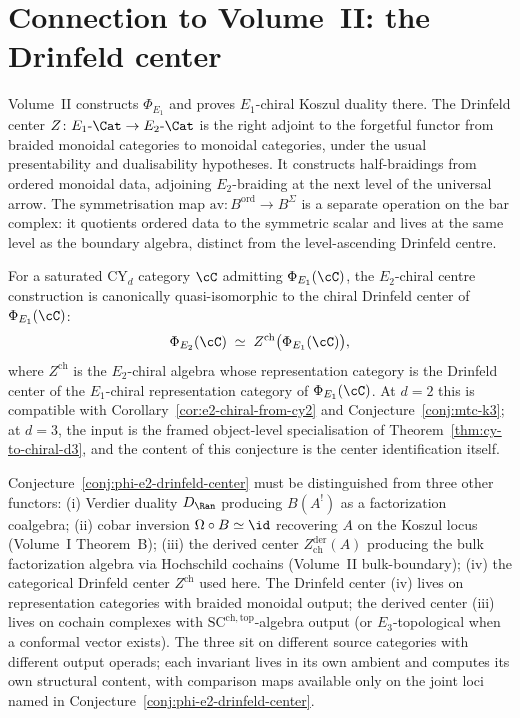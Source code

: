 \section{Connection to Volume~II: the Drinfeld center}
\label{sec:drinfeld-center-bridge}

Volume~II constructs $\Phi_{E_1}$ and proves $E_1$-chiral Koszul
duality there. The Drinfeld center
$Z\colon E_1\text{-}\Cat \to E_2\text{-}\Cat$
is the right adjoint to the forgetful functor from braided monoidal
categories to monoidal categories, under the usual presentability and
dualisability hypotheses. It constructs half-braidings from ordered
monoidal data, adjoining $E_2$-braiding at the next level of the
universal arrow. The symmetrisation map
$\mathrm{av}\colon B^{\mathrm{ord}} \to B^\Sigma$ is a separate
operation on the bar complex: it quotients ordered data to the
symmetric scalar and lives at the same level as the boundary algebra,
distinct from the level-ascending Drinfeld centre.

\begin{conjecture}[\texorpdfstring{$\Phi_{E_2} = Z^{\mathrm{ch}} \circ \Phi_{E_1}$}{Phi-E-2 = Z-ch o Phi-E-1}]
\label{conj:phi-e2-drinfeld-center}
\ClaimStatusConjectured
For a saturated CY$_d$ category $\cC$ admitting
$\Phi_{E_1}(\cC)$, the $E_2$-chiral centre construction is
canonically quasi-isomorphic to the chiral Drinfeld center of
$\Phi_{E_1}(\cC)$:
\[
 \Phi_{E_2}(\cC) \;\simeq\; Z^{\mathrm{ch}}\bigl(\Phi_{E_1}(\cC)\bigr),
\]
where $Z^{\mathrm{ch}}$ is the $E_2$-chiral algebra whose
representation category is the Drinfeld center of the $E_1$-chiral
representation category of $\Phi_{E_1}(\cC)$. At $d=2$ this is
compatible with Corollary~\ref{cor:e2-chiral-from-cy2} and
Conjecture~\ref{conj:mtc-k3}; at $d=3$, the input is the framed
object-level specialisation of Theorem~\ref{thm:cy-to-chiral-d3}, and
the content of this conjecture is the center identification itself.
\end{conjecture}

\begin{remark}
\label{rem:four-functors-and-centres}
Conjecture~\ref{conj:phi-e2-drinfeld-center} must be distinguished
from three other functors: (i) Verdier duality $D_{\Ran}$ producing
$B(A^!)$ as a factorization coalgebra; (ii) cobar inversion
$\Omega \circ B \simeq \id$ recovering $A$ on the Koszul locus
(Volume~I Theorem~B); (iii) the derived center
$Z^{\mathrm{der}}_{\mathrm{ch}}(A)$ producing the bulk factorization
algebra via Hochschild cochains (Volume~II bulk-boundary); (iv) the
categorical Drinfeld center $Z^{\mathrm{ch}}$ used here. The
Drinfeld center (iv) lives on representation categories with braided
monoidal output; the derived center (iii) lives on cochain complexes
with $\mathrm{SC}^{\mathrm{ch,top}}$-algebra output (or
$E_3$-topological when a conformal vector exists). The three sit on
different source categories with different output operads; each
invariant lives in its own ambient and computes its own structural
content, with comparison maps available only on the joint loci named
in Conjecture~\ref{conj:phi-e2-drinfeld-center}.
\end{remark}

